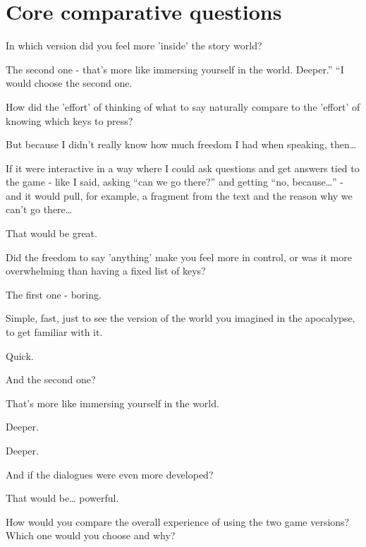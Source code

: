 \section{Core comparative questions}

\begin{QandA}
   \item In which version did you feel more 'inside' the story world?
         \begin{answered}
            The second one - that’s more like immersing yourself in the world. Deeper.”
            “I would choose the second one.
         \end{answered}

   \item How did the 'effort' of thinking of what to say naturally compare to the 'effort' of knowing which keys to press?

         \begin{answered}
            But because I didn’t really know how much freedom I had when speaking, then…

            If it were interactive in a way where I could ask questions and get answers tied to the game - like I said, asking “can we go there?” and getting “no, because…” - and it would pull, for example, a fragment from the text and the reason why we can’t go there…

            That would be great.
         \end{answered}

    \item Did the freedom to say 'anything' make you feel more in control, or was it more overwhelming than having a fixed list of keys?

         \begin{answered}
            The first one - boring.

            Simple, fast, just to see the version of the world you imagined in the apocalypse, to get familiar with it.

            Quick.

            And the second one?

            That’s more like immersing yourself in the world.

            Deeper.

            Deeper.

            And if the dialogues were even more developed?

            That would be… powerful.
         
         \end{answered}
    \item How would you compare the overall experience of using the two game versions? Which one would you choose and why?

         \begin{answered}
         
         \end{answered}
\end{QandA}






